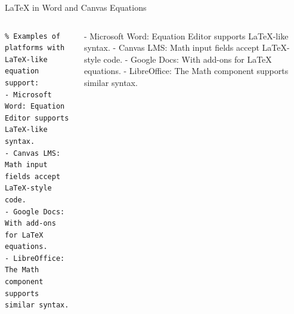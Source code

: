 \documentclass[aspectratio=1610]{beamer}
\begin{document}
\begin{frame}[fragile]{LaTeX in Word and Canvas Equations}
  \begin{columns}[T]
      \begin{lstlisting}
% Examples of platforms with LaTeX-like equation support:
- Microsoft Word: Equation Editor supports LaTeX-like syntax.
- Canvas LMS: Math input fields accept LaTeX-style code.
- Google Docs: With add-ons for LaTeX equations.
- LibreOffice: The Math component supports similar syntax.
      \end{lstlisting}
- Microsoft Word: Equation Editor supports LaTeX-like syntax.
- Canvas LMS: Math input fields accept LaTeX-style code.
- Google Docs: With add-ons for LaTeX equations.
- LibreOffice: The Math component supports similar syntax.
  \end{columns}
\end{frame}

\end{document}
